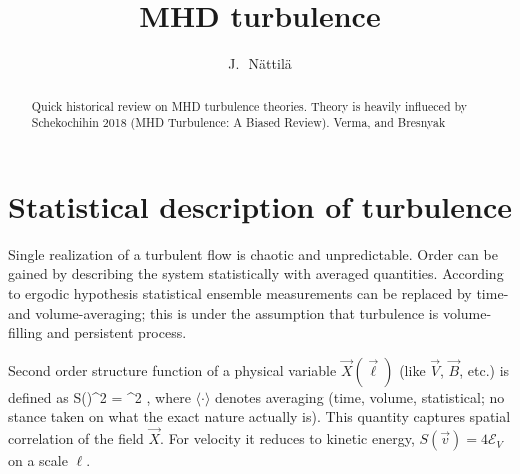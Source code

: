 \documentclass[usenatbib,twocolumn]{aastex63}
\newcommand{\ene}[2]{\mathcal{E}_{#1}^{#2}} %
\begin{document}
\title{MHD turbulence}

\author{J.~\,N\"attil\"a}



\begin{abstract}
Quick historical review on MHD turbulence theories.
Theory is heavily influeced by Schekochihin 2018 (MHD Turbulence: A Biased Review).
Verma,
and Bresnyak
\end{abstract}






\section{Statistical description of turbulence}\label{sect:turb}

Single realization of a turbulent flow is chaotic and unpredictable.
Order can be gained by describing the system statistically with averaged quantities.
According to ergodic hypothesis statistical ensemble measurements can be replaced by time- and volume-averaging;
this is under the assumption that turbulence is volume-filling and persistent process.

Second order structure function of a physical variable $\vec{X}(\vec{\ell})$ (like $\vec{V}$, $\vec{B}$, etc.) is defined as
\be
S(\vec{\ell})^2 = ^2 \rangle,
\ee
where $\langle \cdot \rangle$ denotes averaging (time, volume, statistical; no stance taken on what the exact nature actually is).
This quantity captures spatial correlation of the field $\vec{X}$.
For velocity it reduces to kinetic energy, $S(\vec{v}) = 4 \ene{V}{}$ on a scale $\ell$.
\end{document}
